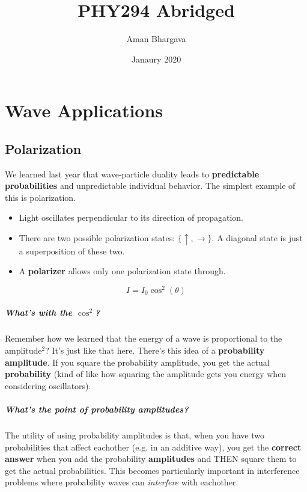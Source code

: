 \documentclass[a4paper,12pt]{report}
\begin{document}
\title{PHY294 Abridged}
\author{Aman Bhargava}
\date{Janaury 2020}
\maketitle

\tableofcontents

\chapter{Wave Applications}
\section{Polarization}

We learned last year that wave-particle duality leads to \textbf{predictable probabilities} and unpredictable individual behavior. The simplest example of this is polarization.
\begin{itemize}
\item Light oscillates perpendicular to its direction of propagation.
\item There are two possible polarization states: $\{\uparrow, \rightarrow\}$. A diagonal state is just a superposition of these two.
\item A \textbf{polarizer} allows only one polarization state through.
\end{itemize}
$$I = I_0 \cos^2(\theta)$$

\paragraph{What's with the $\cos^2$? } Remember how we learned that the energy of a wave is proportional to the amplitude$^2$? It's just like that here. There's this idea of a \textbf{probability amplitude}. If you square the probability amplitude, you get the actual \textbf{probability} (kind of like how squaring the amplitude gets you energy when considering oscillators). 

\paragraph{What's the point of probability amplitudes? } The utility of using probability amplitudes is that, when you have two probabilities that affect eachother (e.g. in an additive way), you get the \textbf{correct answer} when you add the probability \textbf{amplitudes} and THEN square them to get the actual probabilities. This becomes particularly important in interference problems where probability waves can \textit{interfere} with eachother. 
\end{document}
